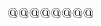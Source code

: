 $${ \uppercase{\gdef\mathch@#1#2#3#4#5#6\mathch@{\global\mathch@false
  \ifx 7#1\ifx 8#2\ifx 9#5\global\mathch@true\xdef\meaning@{9#6}\fi\fi\fi}}}
\newcount\classnum@
\def\getmathch@#1.#2\getmathch@{\classnum@#1 \divide\classnum@4096
 \ifcase\number\classnum@\or\or\gdef\thedots@{\dotsb@}\or
 \gdef\thedots@{\dotsb@}\fi}
\newif\ifmathbin@
{\uccode`4=`b \uccode`5=`i \uccode`6=`n
 \uppercase{\gdef\mathbin@#1#2#3{\relaxnext@
  \DNii@##1\mathbin@{\ifx\space@\next\global\mathbin@true\fi}%
 \global\mathbin@false\DN@##1\mathbin@{}%
 \ifx 4#1\ifx 5#2\ifx 6#3\DN@{\FN@\nextii@}\fi\fi\fi\next@}}}
\newif\ifmathrel@
{\uccode`4=`r \uccode`5=`e \uccode`6=`l
 \uppercase{\gdef\mathrel@#1#2#3{\relaxnext@
  \DNii@##1\mathrel@{\ifx\space@\next\global\mathrel@true\fi}%
 \global\mathrel@false\DN@##1\mathrel@{}%
 \ifx 4#1\ifx 5#2\ifx 6#3\DN@{\FN@\nextii@}\fi\fi\fi\next@}}}
\newif\ifmacro@
{\uccode`5=`m \uccode`6=`a \uccode`7=`c
 \uppercase{\gdef\macro@#1#2#3#4\macro@{\global\macro@false
  \ifx 5#1\ifx 6#2\ifx 7#3\global\macro@true
  \xdef\meaning@{\macro@@#4\macro@@}\fi\fi\fi}}}
\def\macro@@#1->#2\macro@@{#2}
\newif\ifDOTS@
\newcount\DOTSCASE@
{\uccode`6=`\\ \uccode`7=`D \uccode`8=`O \uccode`9=`T \uccode`0=`S
 \uppercase{\gdef\DOTS@#1#2#3#4#5{\global\DOTS@false\DN@##1\DOTS@{}%
  \ifx 6#1\ifx 7#2\ifx 8#3\ifx 9#4\ifx 0#5\let\next@\DOTS@@\fi\fi\fi\fi\fi
  \next@}}}
{\uccode`3=`B \uccode`4=`I \uccode`5=`X
 \uppercase{\gdef\DOTS@@#1{\relaxnext@
  \DNii@##1\DOTS@{\ifx\space@\next\global\DOTS@true\fi}%
  \DN@{\FN@\nextii@}%
  \ifx 3#1\global\DOTSCASE@\z@\else
  \ifx 4#1\global\DOTSCASE@\@ne\else
  \ifx 5#1\global\DOTSCASE@\tw@\else\DN@##1\DOTS@{}%
  \fi\fi\fi\next@}}}
\newif\ifnot@
{\uccode`5=`\\ \uccode`6=`n \uccode`7=`o \uccode`8=`t
 \uppercase{\gdef\not@#1#2#3#4{\relaxnext@
  \DNii@##1\not@{\ifx\space@\next\global\not@true\fi}%
 \global\not@false\DN@##1\not@{}%
 \ifx 5#1\ifx 6#2\ifx 7#3\ifx 8#4\DN@{\FN@\nextii@}\fi\fi\fi
 \fi\next@}}}
\newif\ifkeybin@
\def\keybin@{\keybin@true
 \ifx\next+\else\ifx\next=\else\ifx\next<\else\ifx\next>\else\ifx\next-\else
 \ifx\next*\else\ifx\next:\else\keybin@false\fi\fi\fi\fi\fi\fi\fi}
\def\dots{\RIfM@\expandafter\mdots@\else\expandafter\tdots@\fi}
\def\tdots@{\unskip\relaxnext@
 \DN@{$\m@th\mathinner{\ldotp\ldotp\ldotp}\,
   \ifx\next,\,$\else\ifx\next.\,$\else\ifx\next;\,$\else\ifx\next:\,$\else
   \ifx\next?\,$\else\ifx\next!\,$\else$ \fi\fi\fi\fi\fi\fi}%
 \ \FN@\next@}
\def\mdots@{\FN@\mdots@@}
\def\mdots@@{\gdef\thedots@{\dotso@}%
}$$
